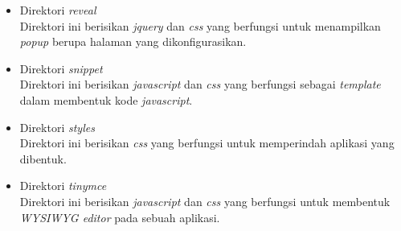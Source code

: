 \begin{itemize}
	\item Direktori \textit{reveal} \\Direktori ini berisikan \textit{jquery} dan \textit{css} yang berfungsi untuk menampilkan \textit{popup} berupa halaman yang dikonfigurasikan.
	\item Direktori \textit{snippet} \\Direktori ini berisikan \textit{javascript} dan \textit{css} yang berfungsi sebagai \textit{template} dalam membentuk kode \textit{javascript}.
	\item Direktori \textit{styles} \\Direktori ini berisikan \textit{css} yang berfungsi untuk memperindah aplikasi yang dibentuk.
	\item Direktori \textit{tinymce} \\Direktori ini berisikan \textit{javascript} dan \textit{css} yang berfungsi untuk membentuk \textit{WYSIWYG editor} pada sebuah aplikasi.
\end{itemize}

